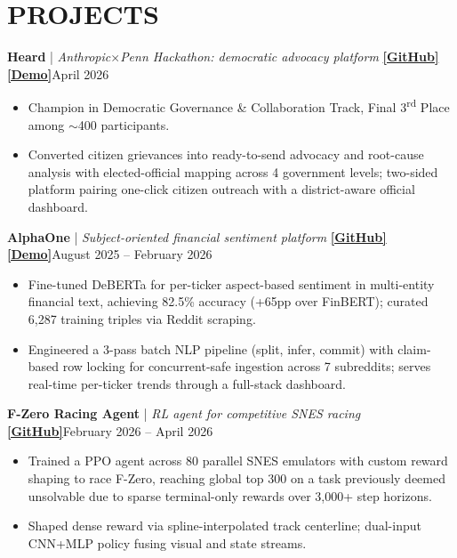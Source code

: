 \documentclass[10pt,letterpaper]{article}
\newcommand{\ressection}[1]{\section*{#1}}
\begin{document}
\ressection{PROJECTS}
\vspace{2pt}
\textbf{Heard} \;|\; \textit{Anthropic$\times$Penn Hackathon: democratic advocacy platform} \textbf{\href{https://github.com/StevenWang-CY/Heard}{[GitHub]} \href{https://drive.google.com/file/d/1CfE05iKRByR8cksqBRl8Ob9zDtzqdjfM/view?usp=sharing}{[Demo]}}\hfill April 2026
\begin{itemize}
    \item Champion in Democratic Governance \& Collaboration Track, Final 3\textsuperscript{rd} Place among $\sim$400 participants.
    \item Converted citizen grievances into ready-to-send advocacy and root-cause analysis with elected-official mapping across 4 government levels; two-sided platform pairing one-click citizen outreach with a district-aware official dashboard.
\end{itemize}
\vspace{3pt}
\textbf{AlphaOne} \;|\; \textit{Subject-oriented financial sentiment platform} \textbf{\href{https://github.com/ArtysicistZ/AlphaOne.git}{[GitHub]} \href{https://artysicistz.github.io/projects/alphaone-demo.html}{[Demo]}}\hfill August 2025 -- February 2026
\begin{itemize}
    \item Fine-tuned DeBERTa for per-ticker aspect-based sentiment in multi-entity financial text, achieving 82.5\% accuracy (+65pp over FinBERT); curated 6,287 training triples via Reddit scraping.
    \item Engineered a 3-pass batch NLP pipeline (split, infer, commit) with claim-based row locking for concurrent-safe ingestion across 7 subreddits; serves real-time per-ticker trends through a full-stack dashboard.
\end{itemize}
\vspace{3pt}
\textbf{F-Zero Racing Agent} \;|\; \textit{RL agent for competitive SNES racing} \textbf{\href{https://github.com/ArtysicistZ/FZero}{[GitHub]}}\hfill February 2026 -- April 2026
\begin{itemize}
    \item Trained a PPO agent across 80 parallel SNES emulators with custom reward shaping to race F-Zero, reaching global top 300 on a task previously deemed unsolvable due to sparse terminal-only rewards over 3,000+ step horizons.
    \item Shaped dense reward via spline-interpolated track centerline; dual-input CNN+MLP policy fusing visual and state streams.
\end{itemize}
\end{document}
